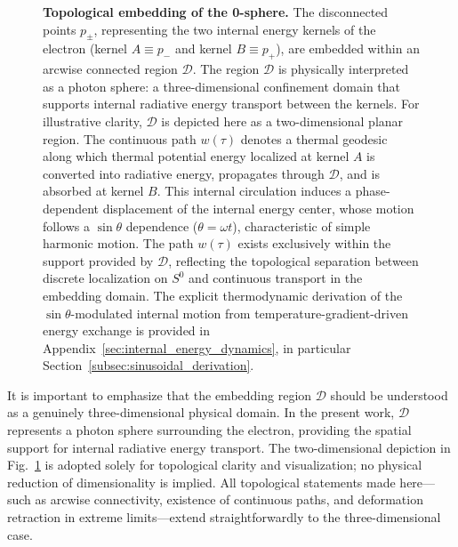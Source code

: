 \documentclass[%
 reprint,
 amsmath,amssymb,
 aps,
 prb,
]{revtex4-2}
\numberwithin{equation}{section}
\begin{document}
\begin{figure}[t!]
\centering
{}
\caption{\justifying \textbf{Topological embedding of the 0-sphere.}
The disconnected points $p_{\pm}$, representing the two internal energy kernels of the electron (kernel $A \equiv p_{-}$ and kernel $B \equiv p_{+}$), are embedded within an arcwise connected region $\mathcal{D}$. 
The region $\mathcal{D}$ is physically interpreted as a photon sphere: a three-dimensional confinement domain that supports internal radiative energy transport between the kernels. 
For illustrative clarity, $\mathcal{D}$ is depicted here as a two-dimensional planar region.
The continuous path $w(\tau)$ denotes a thermal geodesic along which thermal potential energy localized at kernel $A$ is converted into radiative energy, propagates through $\mathcal{D}$, and is absorbed at kernel $B$. 
This internal circulation induces a phase-dependent displacement of the internal energy center, whose motion follows a $\sin\theta$ dependence ($\theta=\omega t$), characteristic of simple harmonic motion.
The path $w(\tau)$ exists exclusively within the support provided by $\mathcal{D}$, reflecting the topological separation between discrete localization on $S^0$ and continuous transport in the embedding domain.
The explicit thermodynamic derivation of the $\sin\theta$-modulated internal motion from temperature-gradient-driven energy exchange is provided in Appendix~\ref{sec:internal_energy_dynamics}, in particular Section~\ref{subsec:sinusoidal_derivation}.}
\label{fig:embedding}


\end{figure}

It is important to emphasize that the embedding region $\mathcal{D}$ should be understood as a genuinely three-dimensional physical domain.
In the present work, $\mathcal{D}$ represents a photon sphere surrounding the electron, providing the spatial support for internal radiative energy transport.
The two-dimensional depiction in Fig.~\ref{fig:embedding} is adopted solely for topological clarity and visualization; no physical reduction of dimensionality is implied.
All topological statements made here—such as arcwise connectivity, existence of continuous paths, and deformation retraction in extreme limits—extend straightforwardly to the three-dimensional case.
\end{document}
